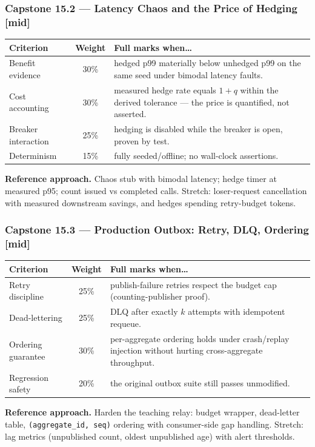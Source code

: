 \subsubsection*{Capstone 15.2 --- Latency Chaos and the Price of Hedging [mid]}
\begin{center}\small
\begin{tabularx}{\textwidth}{l c X}
\toprule
\textbf{Criterion} & \textbf{Weight} & \textbf{Full marks when\ldots} \\
\midrule
Benefit evidence & 30\% & hedged p99 materially below unhedged p99 on the same seed under bimodal latency faults. \\
Cost accounting & 30\% & measured hedge rate equals $1 + q$ within the derived tolerance --- the price is quantified, not asserted. \\
Breaker interaction & 25\% & hedging is disabled while the breaker is open, proven by test. \\
Determinism & 15\% & fully seeded/offline; no wall-clock assertions. \\
\bottomrule
\end{tabularx}
\end{center}
\textbf{Reference approach.} Chaos stub with bimodal latency; hedge timer
at measured p95; count issued vs completed calls. Stretch: loser-request
cancellation with measured downstream savings, and hedges spending
retry-budget tokens.

\subsubsection*{Capstone 15.3 --- Production Outbox: Retry, DLQ, Ordering [mid]}
\begin{center}\small
\begin{tabularx}{\textwidth}{l c X}
\toprule
\textbf{Criterion} & \textbf{Weight} & \textbf{Full marks when\ldots} \\
\midrule
Retry discipline & 25\% & publish-failure retries respect the budget cap (counting-publisher proof). \\
Dead-lettering & 25\% & DLQ after exactly $k$ attempts with idempotent requeue. \\
Ordering guarantee & 30\% & per-aggregate ordering holds under crash/replay injection without hurting cross-aggregate throughput. \\
Regression safety & 20\% & the original outbox suite still passes unmodified. \\
\bottomrule
\end{tabularx}
\end{center}
\textbf{Reference approach.} Harden the teaching relay: budget wrapper,
dead-letter table, \texttt{(aggregate\_id, seq)} ordering with consumer-side
gap handling. Stretch: lag metrics (unpublished count, oldest unpublished
age) with alert thresholds.

